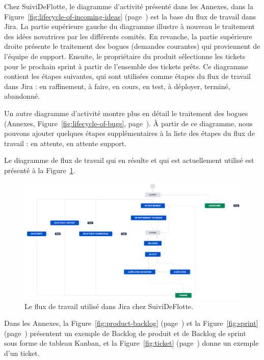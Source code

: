 Chez SuiviDeFlotte, le diagramme d'activité présenté dans les Annexes, dans la Figure~\ref{fig:lifecycle-of-incoming-ideas} (page~\pageref{fig:lifecycle-of-incoming-ideas}) est la base du flux de travail dans Jira. La partie supérieure gauche du diagramme illustre à nouveau le traitement des idées novatrices par les différents comités. En revanche, la partie supérieure droite présente le traitement des bogues (demandes courantes) qui proviennent de l'équipe de support. Ensuite, le propriétaire du produit sélectionne les tickets pour le prochain sprint à partir de l'ensemble des tickets prêts. Ce diagramme contient les étapes suivantes, qui sont utilisées comme étapes du flux de travail dans Jira : en raffinement, à faire, en cours, en test, à déployer, terminé, abandonné.

Un autre diagramme d'activité montre plus en détail le traitement des bogues (Annexes, Figure~\ref{fig:lifecycle-of-bugs}, page~\pageref{fig:lifecycle-of-bugs}). À partir de ce diagramme, nous pouvons ajouter quelques étapes supplémentaires à la liste des étapes du flux de travail : en attente, en attente support.

Le diagramme de flux de travail qui en résulte et qui est actuellement utilisé est présenté à la Figure~\ref{fig:workflow}.

\begin{figure}[h]
    \centering
    \includegraphics[width=\textwidth]{img/workflow-sdfn}
    \caption{Le flux de travail utilisé dans Jira chez SuiviDeFlotte.}
    \label{fig:workflow}
\end{figure}

Dans les Annexes, la Figure~\ref{fig:product-backlog} (page~\pageref{fig:product-backlog}) et la Figure~\ref{fig:sprint} (page~\pageref{fig:sprint}) présentent un exemple de Backlog de produit et de Backlog de sprint sous forme de tableau Kanban, et la Figure~\ref{fig:ticket} (page~\pageref{fig:ticket}) donne un exemple d'un ticket.